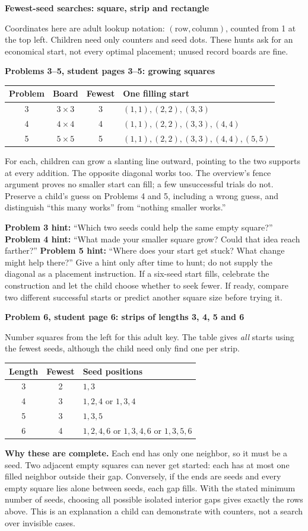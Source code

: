 \documentclass[11pt]{article}
\newcommand{\head}[1]{\par\textbf{\large #1}\par}
\newcommand{\sub}[1]{\par\textbf{#1}\par}
\begin{document}
\newpage
\head{Fewest-seed searches: square, strip and rectangle}
Coordinates here are adult lookup notation: $(\text{row},\text{column})$, counted from 1 at the top left. Children need only counters and seed dots. These hunts ask for an economical start, not every optimal placement; unused record boards are fine.

\sub{Problems 3--5, student pages 3--5: growing squares}
\begin{center}\renewcommand{\arraystretch}{1.15}
\begin{tabular}{c c c l}
Problem & Board & Fewest & One filling start\\\midrule
3 & $3\times3$ & 3 & $(1,1),(2,2),(3,3)$\\
4 & $4\times4$ & 4 & $(1,1),(2,2),(3,3),(4,4)$\\
5 & $5\times5$ & 5 & $(1,1),(2,2),(3,3),(4,4),(5,5)$
\end{tabular}\end{center}
For each, children can grow a slanting line outward, pointing to the two supports at every addition. The opposite diagonal works too. The overview's fence argument proves no smaller start can fill; a few unsuccessful trials do not. Preserve a child's guess on Problems 4 and 5, including a wrong guess, and distinguish ``this many works'' from ``nothing smaller works.''

\textbf{Problem 3 hint:} ``Which two seeds could help the same empty square?'' \textbf{Problem 4 hint:} ``What made your smaller square grow? Could that idea reach farther?'' \textbf{Problem 5 hint:} ``Where does your start get stuck? What change might help there?'' Give a hint only after time to hunt; do not supply the diagonal as a placement instruction. If a six-seed start fills, celebrate the construction and let the child choose whether to seek fewer. If ready, compare two different successful starts or predict another square size before trying it.

\sub{Problem 6, student page 6: strips of lengths 3, 4, 5 and 6}
Number squares from the left for this adult key. The table gives \emph{all} starts using the fewest seeds, although the child need only find one per strip.
\begin{center}\renewcommand{\arraystretch}{1.15}
\begin{tabular}{c c l}
Length & Fewest & Seed positions\\\midrule
3 & 2 & $1,3$\\
4 & 3 & $1,2,4$ or $1,3,4$\\
5 & 3 & $1,3,5$\\
6 & 4 & $1,2,4,6$ or $1,3,4,6$ or $1,3,5,6$
\end{tabular}\end{center}
\textbf{Why these are complete.} Each end has only one neighbor, so it must be a seed. Two adjacent empty squares can never get started: each has at most one filled neighbor outside their gap. Conversely, if the ends are seeds and every empty square lies alone between seeds, each gap fills. With the stated minimum number of seeds, choosing all possible isolated interior gaps gives exactly the rows above. This is an explanation a child can demonstrate with counters, not a search over invisible cases.
\end{document}
